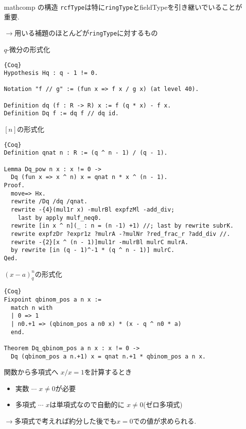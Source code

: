 \documentclass[unicode,mathserif]{beamer}
\begin{document}
\begin{frame}[fragile]
\begin{columns}[T]
\begin{column}{0.33\columnwidth}
\begin{block}{mathcomp の構造}
			{\tt rcfType}は特に{\tt ringType}と{fieldType}を引き継いでいることが重要. 
			
			$\to$用いる補題のほとんどが{\tt ringType}に対するもの
		\end{block}
		
		\begin{block}{$q$-微分の形式化}
			\begin{lstlisting}{Coq}
Hypothesis Hq : q - 1 != 0.

Notation "f // g" := (fun x => f x / g x) (at level 40).

Definition dq (f : R -> R) x := f (q * x) - f x.
Definition Dq f := dq f // dq id. \end{lstlisting}
		\end{block}
		
		\begin{block}{$[n]$の形式化}
			\begin{lstlisting}{Coq}
Definition qnat n : R := (q ^ n - 1) / (q - 1).

Lemma Dq_pow n x : x != 0 ->
  Dq (fun x => x ^ n) x = qnat n * x ^ (n - 1).
Proof.
  move=> Hx.
  rewrite /Dq /dq /qnat.
  rewrite -{4}(mul1r x) -mulrBl expfzMl -add_div;
    last by apply mulf_neq0.
  rewrite [in x ^ n](_ : n = (n -1) +1) //; last by rewrite subrK.
  rewrite expfzDr ?expr1z ?mulrA -?mulNr ?red_frac_r ?add_div //.
  rewrite -{2}[x ^ (n - 1)]mul1r -mulrBl mulrC mulrA.
  by rewrite [in (q - 1)^-1 * (q ^ n - 1)] mulrC.
Qed. \end{lstlisting}
		\end{block}
		
		\begin{block}{$(x - a)^n_q$の形式化}
			\begin{lstlisting}{Coq}
Fixpoint qbinom_pos a n x :=
  match n with
  | 0 => 1
  | n0.+1 => (qbinom_pos a n0 x) * (x - q ^ n0 * a)
  end. 
  
Theorem Dq_qbinom_pos a n x : x != 0 ->
  Dq (qbinom_pos a n.+1) x = qnat n.+1 * qbinom_pos a n x. \end{lstlisting}
		\end{block}

		\begin{block}{関数から多項式へ}
			$x / x = 1$を計算するとき
			\begin{itemize}
				\item 実数 $\cdots$ $x \ne 0$が必要
				\item 多項式 $\cdots$ $x$は単項式なので自動的に $x \ne 0$(ゼロ多項式)
			\end{itemize}
			$\to$多項式で考えれば約分した後でも$x = 0$での値が求められる.
		\end{block}
		

\end{column}
\end{columns}
\end{frame}
\end{document}
